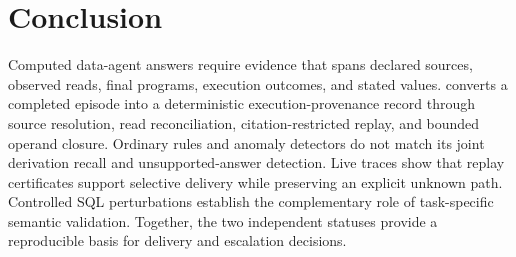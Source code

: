 \section{Conclusion}\label{sec:conclusion}

Computed data-agent answers require evidence that spans declared sources, observed reads, final programs, execution outcomes, and stated values. \ledger converts a completed episode into a deterministic execution-provenance record through source resolution, read reconciliation, citation-restricted replay, and bounded operand closure. Ordinary rules and anomaly detectors do not match its joint derivation recall and unsupported-answer detection. Live traces show that replay certificates support selective delivery while preserving an explicit unknown path. Controlled SQL perturbations establish the complementary role of task-specific semantic validation. Together, the two independent statuses provide a reproducible basis for delivery and escalation decisions.
